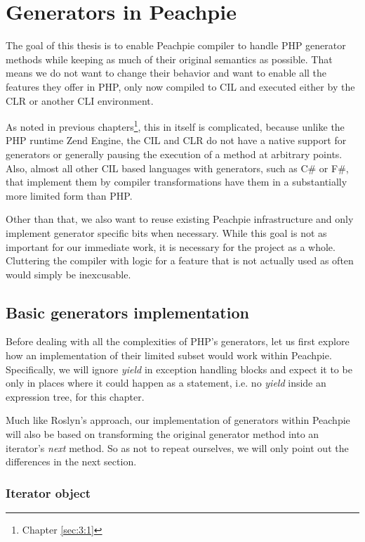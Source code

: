 \chapter{Generators in Peachpie}

The goal of this thesis is to enable Peachpie compiler to handle PHP generator methods while keeping as much of their original semantics as possible. That means we do not want to change their behavior and want to enable all the features they offer in PHP, only now compiled to CIL and executed either by the CLR or another CLI environment.
 
As noted in previous chapters\footnote{Chapter \ref{sec:3:1}}, this in itself is complicated, because unlike the PHP runtime Zend Engine, the CIL and CLR do not have a native support for generators or generally pausing the execution of a method at arbitrary points. Also, almost all other CIL based languages with generators, such as C\# or F\#, that implement them by compiler transformations have them in a substantially more limited form than PHP.

Other than that, we also want to reuse existing Peachpie infrastructure and only implement generator specific bits when necessary. While this goal is not as important for our immediate work, it is necessary for the project as a whole. Cluttering the compiler with logic for a feature that is not actually used as often would simply be inexcusable.

\section{Basic generators implementation}

Before dealing with all the complexities of PHP’s generators, let us first explore how an implementation of their limited subset would work within Peachpie. Specifically, we will ignore \emph{yield} in exception handling blocks and expect it to be only in places where it could happen as a statement, i.e. no \emph{yield} inside an expression tree, for this chapter. 

Much like Roslyn’s approach, our implementation of generators within Peachpie will also be based on transforming the original generator method into an iterator's \emph{next} method. So as not to repeat ourselves, we will only point out the differences in the next section.

\subsection{Iterator object}


